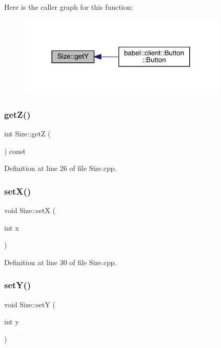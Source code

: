 Here is the caller graph for this function\+:\nopagebreak
\begin{figure}[H]
\begin{center}
\leavevmode
\includegraphics[width=281pt]{class_size_a1ff10ace4300deb61e377f6f63d122e6_icgraph}
\end{center}
\end{figure}
\mbox{\label{class_size_a31f18cf9009c995895e75af2408abc0e}} 
\subsubsection{\texorpdfstring{get\+Z()}{getZ()}}
{\footnotesize\ttfamily int Size\+::getZ (\begin{DoxyParamCaption}{ }\end{DoxyParamCaption}) const}



Definition at line 26 of file Size.\+cpp.

\mbox{\label{class_size_aaa5f33e1c4cba634e0252b66ce578229}} 
\subsubsection{\texorpdfstring{set\+X()}{setX()}}
{\footnotesize\ttfamily void Size\+::setX (\begin{DoxyParamCaption}\item[{int}]{x }\end{DoxyParamCaption})}



Definition at line 30 of file Size.\+cpp.

\mbox{\label{class_size_a78eef0d6971e5f7ef7fb5d017436a4ae}} 
\subsubsection{\texorpdfstring{set\+Y()}{setY()}}
{\footnotesize\ttfamily void Size\+::setY (\begin{DoxyParamCaption}\item[{int}]{y }\end{DoxyParamCaption})}



